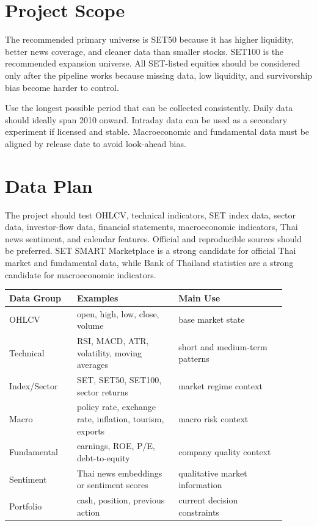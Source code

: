 \documentclass[11pt]{article}
\begin{document}
\section{Project Scope}
The recommended primary universe is SET50 because it has higher liquidity, better news coverage, and cleaner data than smaller stocks. SET100 is the recommended expansion universe. All SET-listed equities should be considered only after the pipeline works because missing data, low liquidity, and survivorship bias become harder to control.

Use the longest possible period that can be collected consistently. Daily data should ideally span 2010 onward. Intraday data can be used as a secondary experiment if licensed and stable. Macroeconomic and fundamental data must be aligned by release date to avoid look-ahead bias.

\section{Data Plan}
The project should test OHLCV, technical indicators, SET index data, sector data, investor-flow data, financial statements, macroeconomic indicators, Thai news sentiment, and calendar features. Official and reproducible sources should be preferred. SET SMART Marketplace is a strong candidate for official Thai market and fundamental data, while Bank of Thailand statistics are a strong candidate for macroeconomic indicators.

\begin{longtable}{p{0.22\linewidth}p{0.33\linewidth}p{0.35\linewidth}}
\toprule
Data Group & Examples & Main Use \\
\midrule
OHLCV & open, high, low, close, volume & base market state \\
Technical & RSI, MACD, ATR, volatility, moving averages & short and medium-term patterns \\
Index/Sector & SET, SET50, SET100, sector returns & market regime context \\
Macro & policy rate, exchange rate, inflation, tourism, exports & macro risk context \\
Fundamental & earnings, ROE, P/E, debt-to-equity & company quality context \\
Sentiment & Thai news embeddings or sentiment scores & qualitative market information \\
Portfolio & cash, position, previous action & current decision constraints \\
\bottomrule
\end{longtable}
\end{document}
